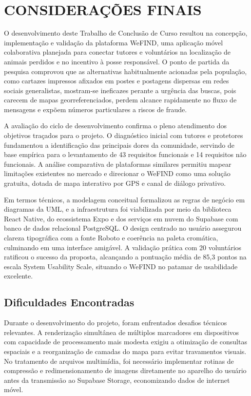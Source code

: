 \section{CONSIDERAÇÕES FINAIS}

O desenvolvimento deste Trabalho de Conclusão de Curso resultou na concepção, implementação e validação da plataforma WeFIND, uma aplicação móvel colaborativa planejada para conectar tutores e voluntários na localização de animais perdidos e no incentivo à posse responsável. O ponto de partida da pesquisa comprovou que as alternativas habitualmente acionadas pela população, como cartazes impressos afixados em postes e postagens dispersas em redes sociais generalistas, mostram-se ineficazes perante a urgência das buscas, pois carecem de mapas georreferenciados, perdem alcance rapidamente no fluxo de mensagens e expõem números particulares a riscos de fraude.

A avaliação do ciclo de desenvolvimento confirma o pleno atendimento dos objetivos traçados para o projeto. O diagnóstico inicial com tutores e protetores fundamentou a identificação das principais dores da comunidade, servindo de base empírica para o levantamento de 43 requisitos funcionais e 14 requisitos não funcionais. A análise comparativa de plataformas similares permitiu mapear limitações existentes no mercado e direcionar o WeFIND como uma solução gratuita, dotada de mapa interativo por GPS e canal de diálogo privativo. 

Em termos técnicos, a modelagem conceitual formalizou as regras de negócio em diagramas da UML, e a infraestrutura foi viabilizada por meio da biblioteca React Native, do ecossistema Expo e dos serviços em nuvem do Supabase com banco de dados relacional PostgreSQL. O design centrado no usuário assegurou clareza tipográfica com a fonte Roboto e coerência na paleta cromática, culminando em uma interface amigável. A validação prática com 20 voluntários ratificou o sucesso da proposta, alcançando a pontuação média de 85,3 pontos na escala System Usability Scale, situando o WeFIND no patamar de usabilidade excelente.

\subsection{Dificuldades Encontradas}

Durante o desenvolvimento do projeto, foram enfrentados desafios técnicos relevantes. A renderização simultânea de múltiplos marcadores em dispositivos com capacidade de processamento mais modesta exigiu a otimização de consultas espaciais e a reorganização de camadas do mapa para evitar travamentos visuais. No tratamento de arquivos multimídia, foi necessário implementar rotinas de compressão e redimensionamento de imagens diretamente no aparelho do usuário antes da transmissão ao Supabase Storage, economizando dados de internet móvel. 


